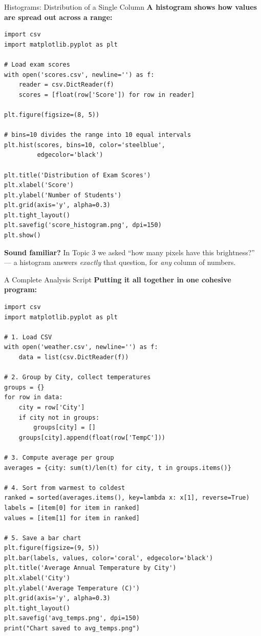 \documentclass{csbeamer}
\begin{document}
\begin{frame}[fragile]{Histograms: Distribution of a Single Column}
    \textbf{A histogram shows how values are \textcolor{marigold}{spread out} across a range:}

    \begin{lstlisting}
import csv
import matplotlib.pyplot as plt

# Load exam scores
with open('scores.csv', newline='') as f:
    reader = csv.DictReader(f)
    scores = [float(row['Score']) for row in reader]

plt.figure(figsize=(8, 5))

# bins=10 divides the range into 10 equal intervals
plt.hist(scores, bins=10, color='steelblue',
         edgecolor='black')

plt.title('Distribution of Exam Scores')
plt.xlabel('Score')
plt.ylabel('Number of Students')
plt.grid(axis='y', alpha=0.3)
plt.tight_layout()
plt.savefig('score_histogram.png', dpi=150)
plt.show()
    \end{lstlisting}

    \pause

    \textbf{Sound familiar?} In Topic 3 we asked ``how many pixels have this brightness?'' ---
    a histogram answers \textcolor{marigold}{\textit{exactly}} that question, for \textit{any} column of numbers.
\end{frame}

\begin{frame}[fragile]{A Complete Analysis Script}
    \textbf{Putting it all together in one cohesive program:}

    \begin{lstlisting}
import csv
import matplotlib.pyplot as plt

# 1. Load CSV
with open('weather.csv', newline='') as f:
    data = list(csv.DictReader(f))

# 2. Group by City, collect temperatures
groups = {}
for row in data:
    city = row['City']
    if city not in groups:
        groups[city] = []
    groups[city].append(float(row['TempC']))

# 3. Compute average per group
averages = {city: sum(t)/len(t) for city, t in groups.items()}

# 4. Sort from warmest to coldest
ranked = sorted(averages.items(), key=lambda x: x[1], reverse=True)
labels = [item[0] for item in ranked]
values = [item[1] for item in ranked]

# 5. Save a bar chart
plt.figure(figsize=(9, 5))
plt.bar(labels, values, color='coral', edgecolor='black')
plt.title('Average Annual Temperature by City')
plt.xlabel('City')
plt.ylabel('Average Temperature (C)')
plt.grid(axis='y', alpha=0.3)
plt.tight_layout()
plt.savefig('avg_temps.png', dpi=150)
print("Chart saved to avg_temps.png")
    \end{lstlisting}
\end{frame}
\end{document}
